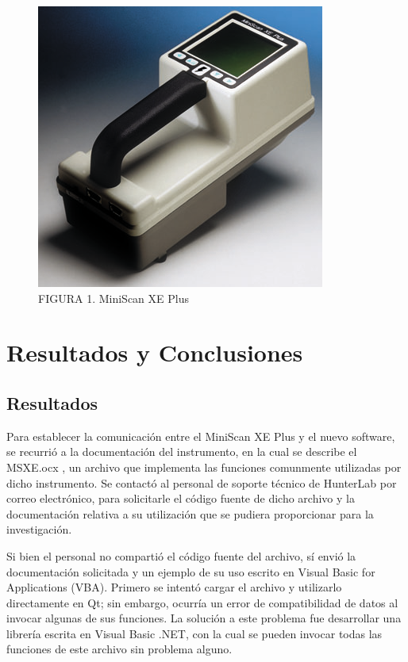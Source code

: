 \documentclass[conference]{IEEEtran}
\begin{document}
\null
\vfill
		\begin{figure}[H]
			\centering
			\label{figura_1}
			\includegraphics[scale=0.9]{img/MiniScanXEPlus}
			\caption{FIGURA 1. MiniScan XE Plus}
		\end{figure}
\vfill

\section{Resultados y Conclusiones}
	
	\subsection{Resultados}
	
	Para establecer la comunicaci\'{o}n entre el MiniScan XE Plus y el nuevo software, se recurri\'{o} a la documentaci\'{o}n del instrumento, en la cual se describe el MSXE.ocx \cite{MiniScanXEPlus-manual}, un archivo que implementa las funciones comunmente utilizadas por dicho instrumento. Se contact\'{o} al personal de soporte t\'{e}cnico de HunterLab por correo electr\'{o}nico, para solicitarle el c\'{o}digo fuente de dicho archivo y la documentaci\'{o}n relativa a su utilizaci\'{o}n que se pudiera proporcionar para la investigaci\'{o}n.
	
	Si bien el personal no comparti\'{o} el c\'{o}digo fuente del archivo, s\'{i} envi\'{o} la documentaci\'{o}n solicitada y un ejemplo de su uso escrito en Visual Basic for Applications (VBA). Primero se intent\'{o} cargar el archivo y utilizarlo directamente en Qt; sin embargo, ocurr\'{i}a un error de compatibilidad de datos al invocar algunas de sus funciones. La soluci\'{o}n a este problema fue desarrollar una librer\'{i}a escrita en Visual Basic .NET, con la cual se pueden invocar todas las funciones de este archivo sin problema alguno.
\end{document}
